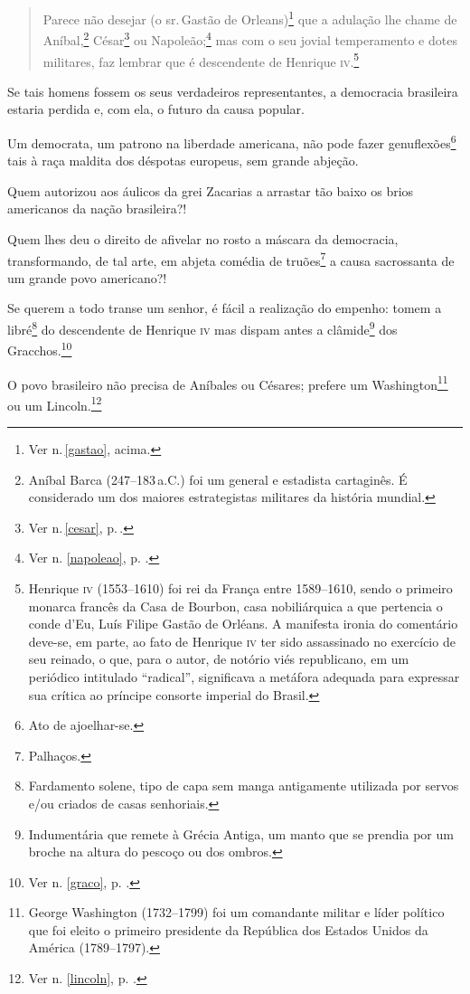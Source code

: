 \begin{quote}
Parece não desejar (o sr.\,Gastão de Orleans)\footnote{Ver n.\,\ref{gastao}, acima.} que a adulação lhe chame de
Aníbal,\footnote{Aníbal Barca (247--183\,a.C.) foi um general e estadista
  cartaginês. É considerado um dos maiores estrategistas militares da
  história mundial.} César\footnote{Ver n.\,\ref{cesar}, p.\,\pageref{cesar}.} ou Napoleão;\footnote{
  Ver n. \ref{napoleao}, p. \pageref{napoleao}.} mas com o seu jovial
temperamento e dotes militares, faz lembrar que é descendente de
Henrique \textsc{iv}.\footnote{Henrique \textsc{iv} (1553--1610) foi rei da França entre
  1589--1610, sendo o primeiro monarca francês da Casa de Bourbon, casa
  nobiliárquica a que pertencia o conde d'Eu, Luís Filipe Gastão de
  Orléans. A manifesta ironia do comentário deve-se, em parte, ao fato
  de Henrique \textsc{iv} ter sido assassinado no exercício de seu reinado, o
  que, para o autor, de notório viés republicano, em um periódico
  intitulado ``radical'', significava a metáfora adequada para expressar
  sua crítica ao príncipe consorte imperial do Brasil.}
\end{quote}  

Se tais homens fossem os seus verdadeiros representantes, a democracia
brasileira estaria perdida e, com ela, o futuro da causa popular.

Um democrata, um patrono na liberdade americana, não pode fazer
genuflexões\footnote{Ato de ajoelhar-se.} tais à raça maldita dos
déspotas europeus, sem grande abjeção.

Quem autorizou aos áulicos da grei Zacarias a arrastar tão baixo os
brios americanos da nação brasileira?!

Quem lhes deu o direito de afivelar no rosto a máscara da democracia,
transformando, de tal arte, em abjeta comédia de truões\footnote{
  Palhaços.} a causa sacrossanta de um grande povo americano?!

Se querem a todo transe um senhor, é fácil a realização do empenho:
tomem a libré\footnote{Fardamento solene, tipo de capa sem manga
  antigamente utilizada por servos e/ou criados de casas senhoriais.} do
descendente de Henrique \textsc{iv} mas dispam antes a clâmide\footnote{
  Indumentária que remete à Grécia Antiga, um manto que se prendia por
  um broche na altura do pescoço ou dos ombros.} dos
Gracchos.\footnote{Ver n. \ref{graco}, p. \pageref{graco}.}

O povo brasileiro não precisa de Aníbales ou Césares; prefere um
Washington\footnote{George Washington (1732--1799) foi um comandante
  militar e líder político que foi eleito o primeiro presidente da
  República dos Estados Unidos da América (1789--1797).} ou um
Lincoln.\footnote{Ver n. \ref{lincoln}, p. \pageref{lincoln}.}

